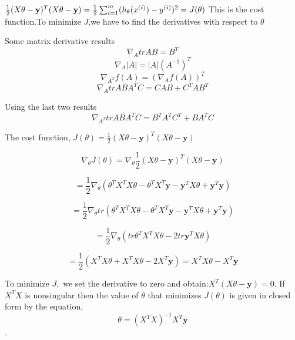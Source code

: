\documentclass[12pt]{article}
\begin{document}
 
 $\frac{1}{2}(X\theta-\textbf y)^{T}(X\theta-\textbf y)=\frac{1}{2} \sum_{i=1}^{m}(h_{\theta}(x^{(i)})-y^{(i)})^{2}=J(\theta)$ This is the cost function.To minimize $J$,we have to find the derivatives with respect to $\theta$
 
 
 
 
Some matrix derivative results 
 $$\nabla_{A}tr AB = B^{T}$$ 
 $$\nabla_{A}\vert A\vert=\vert A\vert(A^{-1})^{T}$$ 
 $$\nabla_{A^{T}}f(A)= (\nabla_{A}f(A))^{T}$$ 
 $$\nabla_{A}trABA^{T}C=CAB+C^{T}AB^{T}$$
 
 
 Using the last two results 
 $$\nabla_{A^{T}}trABA^{T}C=B^{T}A^{T}C^{T}+BA^{T}C$$
 
 
 
 The cost function,  $J(\theta)=\frac{1}{2}(X\theta-\textbf{y})^{T}(X\theta-\textbf{y})$
 
 
$$ \nabla_{\theta} J(\theta)  =\nabla_{\theta}\frac{1}{2}(X\theta-\textbf{y})^{T}(X\theta-\textbf{y}) $$
 
 
 
  $$=\frac{1}{2}\nabla_{\theta}(\theta^{T}X^{T}X\theta-\theta^{T}X^{T}\textbf{y}-\textbf{y}^{T}X\theta+\textbf{y}^{T}\textbf{y}) $$
 
 
 
$$ =\frac{1}{2}\nabla_{\theta} tr(\theta^{T}X^{T}X\theta-\theta^{T}X^{T}\textbf{y}-\textbf{y}^{T}X\theta+\textbf{y}^{T}\textbf{y}) $$
 
 
 
 
$$=\frac{1}{2}\nabla_{\theta}(tr \theta^{T}X^{T}X\theta-2tr\textbf{y}^{T}X\theta)  $$
 
 

$$=\frac{1}{2}(X^{T}X\theta+X^{T}X\theta-2X^{T}\textbf{y})  =X^{T}X\theta-X^{T}\textbf{y} $$







To minimize $J,$ we set the derivative to zero and obtain:$X^{T}(X\theta-\textbf{y})=0$. If $X^{T}X$ is nonsingular then the value of $\theta $ that minimizes $J(\theta)$ is given in closed form by the equation,
$$\theta=(X^{T}X)^{-1}X^{T}\textbf{y}$$.






 
\end{document}
